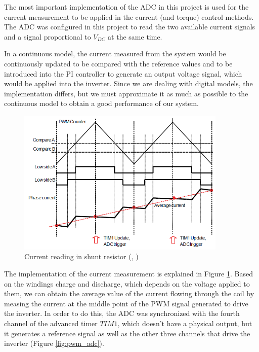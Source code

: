 The most important implementation of the \ac{ADC} in this project is used for the current measurement to be applied in the current (and torque) control methods. The \ac{ADC} was configured in this project to read the two available current signals and a signal proportional to $V_{DC}$ at the same time. 

In a continuous model, the current measured from the system would be continuously updated to be compared with the reference values and to be introduced into the \ac{PI} controller to generate an output voltage signal, which would be applied into the inverter. Since we are dealing with digital models, the implementation differs, but we must approximate it as much as possible to the continuous model to obtain a good performance of our system.

\begin{figure}[htbp]
\centering
\includegraphics[width=10cm]{Images/pwm_adc_current_2.png} 
\caption[Current reading in shunt resistor]{Current reading in shunt resistor (\citeauthor{stm32FOC}, \citeyear{stm32FOC})}
\label{fig:pwm_adc_current_2}
\end{figure}

The implementation of the current measurement is explained in Figure \ref{fig:pwm_adc_current_2}. Based on the windings charge and discharge, which depends on the voltage applied to them, we can obtain the average value of the current flowing through the coil by measing the current at the middle point of the PWM signal generated to drive the inverter. In order to do this, the \ac{ADC} was synchronized with the fourth channel of the advanced timer $TIM1$, which doesn't have a physical output, but it generates a reference signal as well as the other three channels that drive the inverter (Figure \ref{fig:pwm_adc}).

